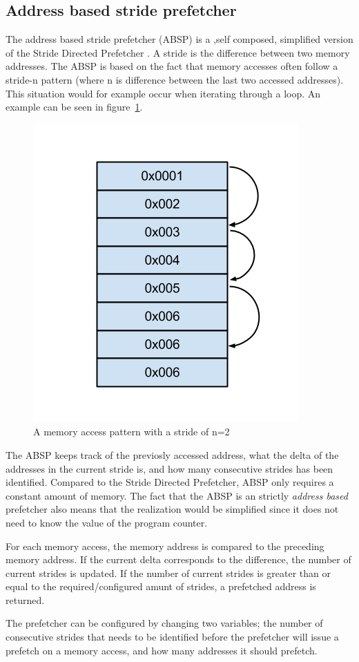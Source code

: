 \subsection{Address based stride prefetcher}
\label{sec:stridePrefetcher}
The address based stride prefetcher (ABSP) is a ,self composed, simplified version of
the Stride Directed Prefetcher \cite{stride}. A stride is the difference between two memory addresses. The ABSP is based on the fact that
memory accesses often follow a stride-n pattern (where n is difference between the last two accessed addresses). This situation would for example occur when iterating through a loop. An example can be seen in figure~\ref{fig:stride}.

\begin{figure}[H]
\centerline{\includegraphics[scale=0.5]{./figures/stride}}
\caption{A memory access pattern with a stride of n=2}
\label{fig:stride}
\end{figure}

The ABSP keeps track of the previosly accessed address, what the delta of the addresses in the current stride is, and
how many consecutive strides has been identified. Compared to the Stride Directed Prefetcher, ABSP only requires a constant amount of memory. The fact that the ABSP is an strictly \emph{address based} prefetcher also means that the realization would be simplified since it does not need to know the value of the program counter.

For each memory access, the memory address is compared to the preceding
memory address. If the current delta corresponds to the
difference, the number of current strides is updated. If the number of
current strides is greater than or equal to the required/configured
amunt of strides, a prefetched address is returned.  

The prefetcher can be configured by changing two variables;
the number of consecutive strides that needs to be identified before
the prefetcher will issue a prefetch on a memory access, and how many addresses it should prefetch.


